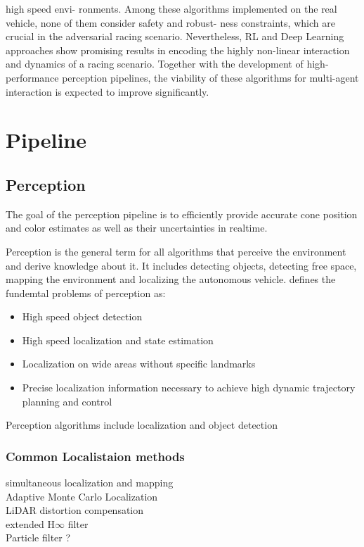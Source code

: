 high speed envi- ronments. Among these algorithms implemented on the real vehicle, none of them consider safety and robust- ness constraints, which are crucial in the adversarial racing scenario. Nevertheless, RL and Deep Learning approaches show promising results in encoding the highly non-linear interaction and dynamics of a racing scenario. Together with the development of high-performance perception pipelines, the viability of these algorithms for multi-agent interaction is expected to improve significantly.
\cite{johan22}


\cite{deepLearning19}


\cite{softwareArch19}


\cite{indyChallange22}


\cite{TUM23}



\cite{AMZ20}

\section{Pipeline}
\subsection{Perception}
The goal of the perception pipeline is to efficiently provide accurate cone position and color estimates as well as their uncertainties in realtime.\cite{AMZ20}

Perception is the general term for all algorithms that perceive the environment and derive knowledge about it. It includes detecting objects, detecting free space, mapping the environment and localizing the autonomous vehicle. \cite{johan22} defines the fundemtal problems of perception as:
\begin{itemize}
	\item High speed object detection
	\item High speed localization and state estimation
	\item Localization on wide areas without specific landmarks
	\item Precise localization information necessary to achieve high dynamic trajectory planning and control
\end{itemize}

Perception algorithms include localization and object detection \cite{johan22} 

\subsubsection{Common Localistaion methods}
\begin{description}
	\item[simultaneous localization and mapping] 
	\item[Adaptive Monte Carlo Localization] 
	\item[LiDAR distortion compensation] 
	\item[extended H$\infty$ filter] 
	\item[Particle filter ?] 
\end{description}



